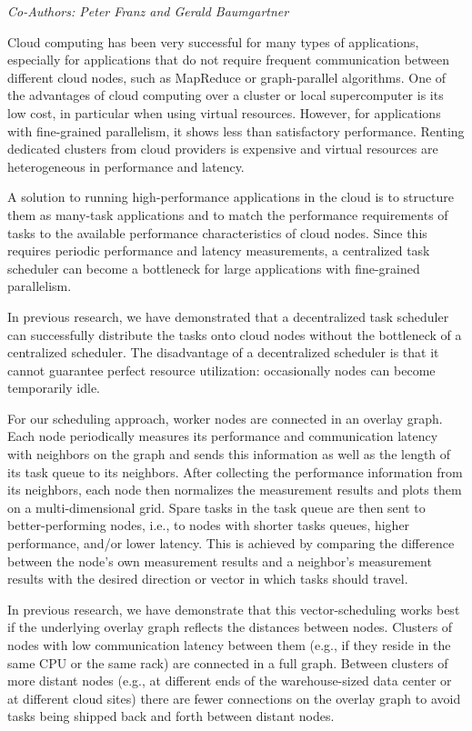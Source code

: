 \begin{center}
\textit{Co-Authors: Peter Franz and Gerald Baumgartner}
\end{center} 
Cloud computing has been very successful for many types of
applications, especially for applications that do not require frequent
communication between different cloud nodes, such as MapReduce or
graph-parallel algorithms. One of the advantages of cloud computing
over a cluster or local supercomputer is its low cost, in particular
when using virtual resources. However, for applications with
fine-grained parallelism, it shows less than satisfactory performance.
Renting dedicated clusters from cloud providers is expensive and
virtual resources are heterogeneous in performance and latency.

A solution to running high-performance applications in the cloud is to
structure them as many-task applications and to match the performance
requirements of tasks to the available performance characteristics of
cloud nodes. Since this requires periodic performance and latency
measurements, a centralized task scheduler can become a bottleneck for
large applications with fine-grained parallelism.

In previous research, we have demonstrated that a decentralized task
scheduler can successfully distribute the tasks onto cloud nodes
without the bottleneck of a centralized scheduler. The disadvantage
of a decentralized scheduler is that it cannot guarantee perfect
resource utilization: occasionally nodes can become temporarily idle.

For our scheduling approach, worker nodes are connected in an overlay
graph. Each node periodically measures its performance and
communication latency with neighbors on the graph and sends this
information as well as the length of its task queue to its neighbors.
After collecting the performance information from its neighbors, each
node then normalizes the measurement results and plots them on a
multi-dimensional grid. Spare tasks in the task queue are then sent
to better-performing nodes, i.e., to nodes with shorter tasks queues,
higher performance, and/or lower latency. This is achieved by
comparing the difference between the node's own measurement results
and a neighbor's measurement results with the desired direction or
vector in which tasks should travel.

In previous research, we have demonstrate that this vector-scheduling
works best if the underlying overlay graph reflects the distances
between nodes. Clusters of nodes with low communication latency
between them (e.g., if they reside in the same CPU or the same rack)
are connected in a full graph. Between clusters of more distant nodes
(e.g., at different ends of the warehouse-sized data center or at
different cloud sites) there are fewer connections on the overlay
graph to avoid tasks being shipped back and forth between distant
nodes.

